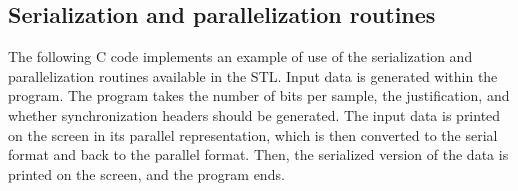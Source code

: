 \subsection{Serialization and parallelization routines}

The following C code implements an example of use of the
serialization and parallelization routines available in the STL.
Input data is generated within the program. The program takes the
number of bits per sample, the justification, and whether synchronization
headers should be generated. The input data is printed on the screen in
its parallel representation, which is then converted to the serial
format and back to the parallel format. Then, the serialized version
of the data is printed on the screen, and the program ends.


